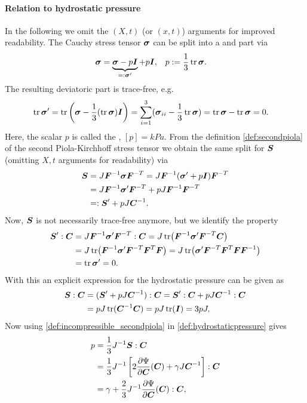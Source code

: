 \paragraph{Relation to hydrostatic pressure}
In the following we omit the $(X,t)$ (or $(x,t)$) arguments for improved readability.
The Cauchy stress tensor $\vsig$ can be split into a  and  part via
\begin{align}
	\vsig &= \underbrace{\vsig - p\vI}_{=:\vsig'} + p\vI, & p &:= \frac{1}{3}\tr\vsig.
\end{align}
The resulting deviatoric part is trace-free, e.g.
\begin{align}
	\tr{\vsig'} &= \tr\left(\vsig - \frac{1}{3}(\tr\vsig)\vI\right) = \suml{i=1}{3}(\vsig_{ii} - \frac{1}{3}\tr\vsig) = \tr\vsig - \tr\vsig = 0.
\end{align}
Here, the scalar $p$ is called the , $[p] = kPa$.
From the definition \eqref{def:secondpiola} of the second Piola-Kirchhoff stress tensor we obtain the same split for $\vS$
(omitting $X,t$ arguments for readability) via
\begin{align}
	\vS &= J\vF^{-1}\vsig\vF^{-T} = J\vF^{-1}(\vsig' + p\vI)\vF^{-T}\\
		&= J\vF^{-1}\vsig'\vF^{-T} + pJ\vF^{-1}\vF^{-T}\\
		&=: \vS' + pJ\vC^{-1}.
\end{align}
Now, $\vS$ is not necessarily trace-free anymore, but we identify the property
\begin{align}
	\vS' : \vC &= J\vF^{-1}\vsig'\vF^{-T} : \vC = J\tr\bigl(\vF^{-1}\vsig'\vF^{-T}\vC\bigr)\\
		&= J\tr\bigl(\vF^{-1}\vsig'\vF^{-T}\vF^T\vF\bigr) = J\tr\bigl(\vsig'\vF^{-T}\vF^T\vF\vF^{-1}\bigr)\\
		&= \tr\vsig' = 0.
\end{align}
With this an explicit expression for the hydrostatic pressure can be given as
\begin{align}
	\vS : \vC &= (\vS' + pJ\vC^{-1}) : \vC = \vS': \vC + pJ\vC^{-1} : \vC\\
	&= pJ\tr(\vC^{-1}\vC) = pJ\tr(\vI) = 3pJ,\label{def:hydrostaticpressure}
\end{align}
Now using \eqref{def:incompressible_secondpiola} in \eqref{def:hydrostaticpressure} gives
\begin{align}
	p &= \frac{1}{3}J^{-1}\vS : \vC\\
	  &= \frac{1}{3}J^{-1}\left[2\d{\Psi}{\vC}(\vC) + \gamma J\vC^{-1}\right] : \vC\\
	  &= \gamma + \frac{2}{3}J^{-1}\d{\Psi}{\vC}(\vC):\vC,
\end{align}
